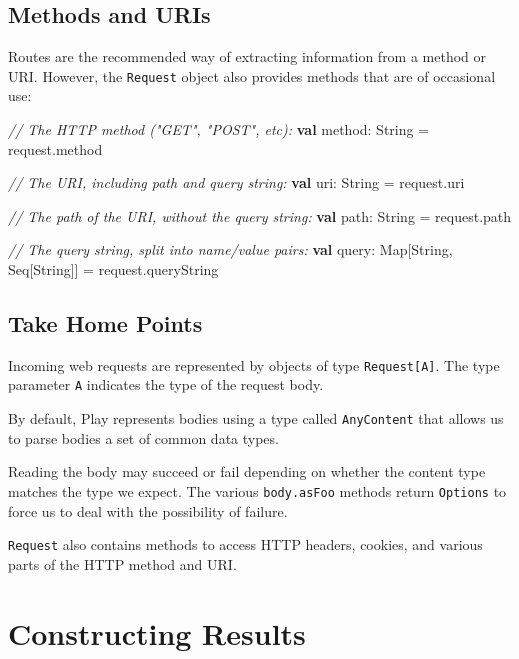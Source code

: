 \documentclass[oneside,11pt,a4paper,]{book}
\newenvironment{Shaded}{\begin{snugshade}}{\end{snugshade}}
\newcommand{\KeywordTok}[1]{\textcolor[rgb]{0.13,0.29,0.53}{\textbf{{#1}}}}
\newcommand{\CommentTok}[1]{\textcolor[rgb]{0.56,0.35,0.01}{\textit{{#1}}}}
\newcommand{\FunctionTok}[1]{\textcolor[rgb]{0.00,0.00,0.00}{{#1}}}
\newcommand{\NormalTok}[1]{{#1}}
\begin{document}
\subsection{Methods and URIs}\label{methods-and-uris}

Routes are the recommended way of extracting information from a method
or URI. However, the \texttt{Request} object also provides methods that
are of occasional use:

\begin{Shaded}
\begin{Highlighting}[]
\CommentTok{// The HTTP method ("GET", "POST", etc):}
\KeywordTok{val} \NormalTok{method: String = request.}\FunctionTok{method}

\CommentTok{// The URI, including path and query string:}
\KeywordTok{val} \NormalTok{uri: String = request.}\FunctionTok{uri}

\CommentTok{// The path of the URI, without the query string:}
\KeywordTok{val} \NormalTok{path: String = request.}\FunctionTok{path}

\CommentTok{// The query string, split into name/value pairs:}
\KeywordTok{val} \NormalTok{query: Map[String, Seq[String]] = request.}\FunctionTok{queryString}
\end{Highlighting}
\end{Shaded}

\subsection{Take Home Points}\label{take-home-points-2}

Incoming web requests are represented by objects of type
\texttt{Request{[}A{]}}. The type parameter \texttt{A} indicates the
type of the request body.

By default, Play represents bodies using a type called
\texttt{AnyContent} that allows us to parse bodies a set of common data
types.

Reading the body may succeed or fail depending on whether the content
type matches the type we expect. The various \texttt{body.asFoo} methods
return \texttt{Options} to force us to deal with the possibility of
failure.

\texttt{Request} also contains methods to access HTTP headers, cookies,
and various parts of the HTTP method and URI.

\section{Constructing Results}\label{constructing-results}
\end{document}
